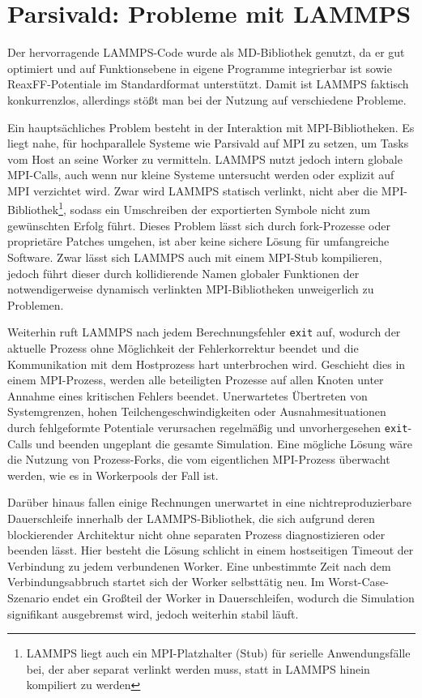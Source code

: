 \chapter{Parsivald: Probleme mit LAMMPS}
\label{lammpssucks}

Der hervorragende LAMMPS-Code wurde als MD-Bibliothek genutzt, da er gut optimiert und auf Funktionsebene in eigene Programme integrierbar ist sowie ReaxFF-Potentiale im Standardformat unterstützt.
Damit ist LAMMPS faktisch konkurrenzlos, allerdings stößt man bei der Nutzung auf verschiedene Probleme.

Ein hauptsächliches Problem besteht in der Interaktion mit MPI-Bibliotheken.
Es liegt nahe, für hochparallele Systeme wie Parsivald auf MPI zu setzen, um Tasks vom Host an seine Worker zu vermitteln.
LAMMPS nutzt jedoch intern globale MPI-Calls, auch wenn nur kleine Systeme untersucht werden oder explizit auf MPI verzichtet wird.
Zwar wird LAMMPS statisch verlinkt, nicht aber die MPI-Bibliothek\footnote{LAMMPS liegt auch ein MPI-Platzhalter (Stub) für serielle Anwendungsfälle bei, der aber separat verlinkt werden muss, statt in LAMMPS hinein kompiliert zu werden}, sodass ein Umschreiben der exportierten Symbole nicht zum gewünschten Erfolg führt.
Dieses Problem lässt sich durch fork-Prozesse oder proprietäre Patches umgehen, ist aber keine sichere Lösung für umfangreiche Software.
Zwar lässt sich LAMMPS auch mit einem MPI-Stub kompilieren, jedoch führt dieser durch kollidierende Namen globaler Funktionen der notwendigerweise dynamisch verlinkten MPI-Bibliotheken unweigerlich zu Problemen.

Weiterhin ruft LAMMPS nach jedem Berechnungsfehler \texttt{exit} auf, wodurch der aktuelle Prozess ohne Möglichkeit der Fehlerkorrektur beendet und die Kommunikation mit dem Hostprozess hart unterbrochen wird.
Geschieht dies in einem MPI-Prozess, werden alle beteiligten Prozesse auf allen Knoten unter Annahme eines kritischen Fehlers beendet.
Unerwartetes Übertreten von Systemgrenzen, hohen Teilchengeschwindigkeiten oder Ausnahmesituationen durch fehlgeformte Potentiale verursachen regelmäßig und unvorhergesehen \texttt{exit}-Calls und beenden ungeplant die gesamte Simulation.
Eine mögliche Lösung wäre die Nutzung von Prozess-Forks, die vom eigentlichen MPI-Prozess überwacht werden, wie es in Workerpools der Fall ist.

Darüber hinaus fallen einige Rechnungen unerwartet in eine nichtreproduzierbare Dauerschleife innerhalb der LAMMPS-Bibliothek, die sich aufgrund deren blockierender Architektur nicht ohne separaten Prozess diagnostizieren oder beenden lässt.
Hier besteht die Lösung schlicht in einem hostseitigen Timeout der Verbindung zu jedem verbundenen Worker.
Eine unbestimmte Zeit nach dem Verbindungsabbruch startet sich der Worker selbsttätig neu.
Im Worst-Case-Szenario endet ein Großteil der Worker in Dauerschleifen, wodurch die Simulation signifikant ausgebremst wird, jedoch weiterhin stabil läuft.


